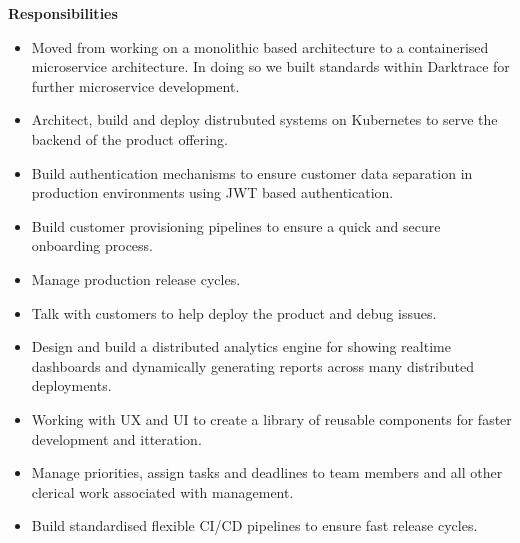 \documentclass[10pt,a4paper]{altacv}
\begin{document}
\textbf{Responsibilities}
\begin{itemize}
  \item Moved from working on a monolithic based architecture to a containerised microservice architecture. In doing so we built standards within Darktrace for further microservice development.
  \item Architect, build and deploy distrubuted systems on Kubernetes to serve the backend of the product offering.
  \item Build authentication mechanisms to ensure customer data separation in production environments using JWT based authentication.
  \item Build customer provisioning pipelines to ensure a quick and secure onboarding process.
  \item Manage production release cycles.
  \item Talk with customers to help deploy the product and debug issues.
  \item Design and build a distributed analytics engine for showing realtime dashboards and dynamically generating reports across many distributed deployments.
  \item Working with UX and UI to create a library of reusable components for faster development and itteration.
  \item Manage priorities, assign tasks and deadlines to team members and all other clerical work associated with management.
  \item Build standardised flexible CI/CD pipelines to ensure fast release cycles.
  \newline
  \newline
\end{itemize}



\end{document}
